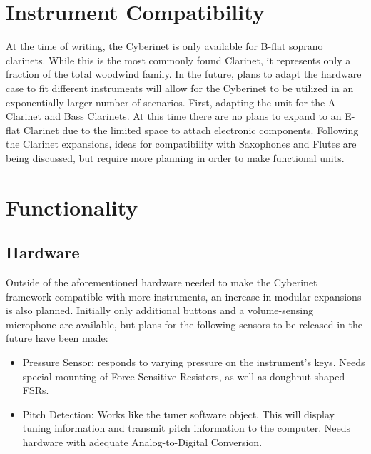 \section{Instrument Compatibility}
At the time of writing, the Cyberinet is only available for B-flat soprano clarinets. While this is the most commonly found Clarinet, it represents only a fraction of the total woodwind family. In the future, plans to adapt the hardware case to fit different instruments will allow for the Cyberinet to be utilized in an exponentially larger number of scenarios. 
First, adapting the unit for the A Clarinet and Bass Clarinets. At this time there are no plans to expand to an E-flat Clarinet due to the limited space to attach electronic components.
Following the Clarinet expansions, ideas for compatibility with Saxophones and Flutes are being discussed, but require more planning in order to make functional units.

\section{Functionality}


\subsection{Hardware}
Outside of the aforementioned hardware needed to make the Cyberinet framework compatible with more instruments, an increase in modular expansions is also planned. Initially only additional buttons and a volume-sensing microphone are available, but plans for the following sensors to be released in the future have been made:

\begin{itemize}
    \item Pressure Sensor: responds to varying pressure on the instrument's keys. Needs special mounting of Force-Sensitive-Resistors, as well as doughnut-shaped FSRs.
    \item Pitch Detection: Works like the tuner software object. This will display tuning information and transmit pitch information to the computer. Needs hardware with adequate Analog-to-Digital Conversion.
\end{itemize}

